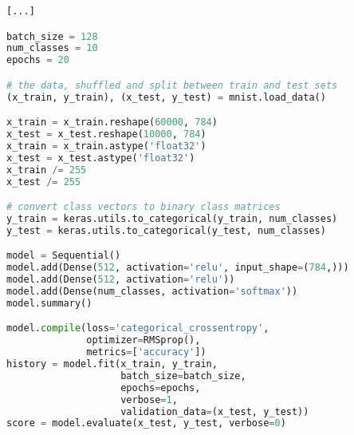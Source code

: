 

\begin{minipage}{\linewidth}
\small
\begin{lstlisting}[language=Python, label=lst:keras, caption={Beispiel für MNIST mit Keras}]
[...]

batch_size = 128
num_classes = 10
epochs = 20

# the data, shuffled and split between train and test sets
(x_train, y_train), (x_test, y_test) = mnist.load_data()

x_train = x_train.reshape(60000, 784)
x_test = x_test.reshape(10000, 784)
x_train = x_train.astype('float32')
x_test = x_test.astype('float32')
x_train /= 255
x_test /= 255

# convert class vectors to binary class matrices
y_train = keras.utils.to_categorical(y_train, num_classes)
y_test = keras.utils.to_categorical(y_test, num_classes)

model = Sequential()
model.add(Dense(512, activation='relu', input_shape=(784,)))
model.add(Dense(512, activation='relu'))
model.add(Dense(num_classes, activation='softmax'))
model.summary()

model.compile(loss='categorical_crossentropy',
              optimizer=RMSprop(),
              metrics=['accuracy'])
history = model.fit(x_train, y_train,
                    batch_size=batch_size,
                    epochs=epochs,
                    verbose=1,
                    validation_data=(x_test, y_test))
score = model.evaluate(x_test, y_test, verbose=0)
\end{lstlisting}
\end{minipage}